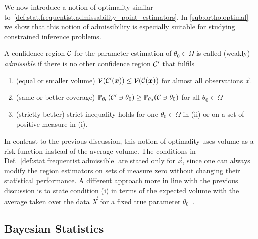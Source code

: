We now introduce a notion of optimality similar to~\cref{def:stat.frequentist.admissability_point_estimators}.
In \cref{sub:ortho.optimal} we show that this notion of admissibility is especially suitable for studying constrained inference problems.
\begin{definition}{\cite[Def. 2.2]{Joshi_1969_Admissibility}}
  \label{def:stat.frequentist.admissible}
  A confidence region $\mathcal{C}$ for the parameter estimation of $\theta_0 \in \Omega$ is called (weakly) \emph{admissible} if there is no other confidence region $\mathcal{C}'$ that fulfils
  \begin{enumerate}
    \item(equal or smaller volume) $\mathcal{V}(\mathcal{C}'({\boldsymbol{x}})) \le \mathcal{V}(\mathcal{C}({\boldsymbol{x}}))$ for almost all observations $\vec x$.
    \item(same or better coverage) $\mathbb{P}_{\theta_0}(\mathcal{C}' \owns \theta_0) \ge \mathbb{P}_{\theta_0}(\mathcal{C} \owns \theta_0)$ for all $\theta_0 \in \Omega$
    \item(strictly better) strict inequality holds for one $\theta_0 \in \Omega$ in (ii) or on a set of positive measure in (i).
  \end{enumerate}
\end{definition}
In contrast to the previous discussion, this notion of optimality uses  volume as a risk function instead of the average volume.
The conditions in Def.~\ref{def:stat.frequentist.admissible} are stated only for  $\vec x$, since one can always modify the region estimators on sets of measure zero without changing their statistical performance.
A different approach more in line with the previous discussion is to state condition (i) in terms of the expected volume with the average taken over the data $\vec X$ for a fixed true parameter $\theta_0$~\cite[Def.~7.1]{Joshi_1969_Admissibility}.


\subsection{Bayesian Statistics}
\label{sub:stat.bayesian}


